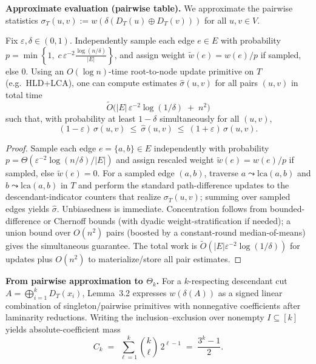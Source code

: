 \documentclass[11pt,letterpaper]{article}
\begin{document}
\medskip
\noindent\textbf{Approximate evaluation (pairwise table).}
We approximate the pairwise statistics $\sigma_T(u,v):=w(\delta(D_T(u)\oplus D_T(v)))$ for all $u,v\in V$.

\begin{lemma}\label{lem:approx-sigma}
Fix $\varepsilon,\delta\in(0,1)$. Independently sample each edge $e\in E$ with probability
$p=\min\!\left\{1,\;c\,\varepsilon^{-2}\frac{\log(n/\delta)}{|E|}\right\}$,
and assign weight $\tilde w(e)=w(e)/p$ if sampled, else $0$.
Using an $O(\log n)$-time root-to-node update primitive on $T$ (e.g.\ HLD+LCA),
one can compute estimates $\hat\sigma(u,v)$ for all pairs $(u,v)$ in total time
\[
\tilde O\!\Big(|E|\,\varepsilon^{-2}\log(1/\delta)\;+\;n^2\Big)
\]
such that, with probability at least $1-\delta$ simultaneously for all $(u,v)$,
\[
(1-\varepsilon)\,\sigma(u,v)\ \le\ \hat\sigma(u,v)\ \le\ (1+\varepsilon)\,\sigma(u,v).
\]
\end{lemma}

\begin{proof}
Sample each edge $e=\{a,b\}\in E$ independently with probability
$p=\Theta(\varepsilon^{-2}\log(n/\delta)/|E|)$ and assign rescaled weight
$\tilde w(e)=w(e)/p$ if sampled, else $\tilde w(e)=0$.
For a sampled edge $(a,b)$, traverse $a\leadsto \mathrm{lca}(a,b)$ and $b\leadsto \mathrm{lca}(a,b)$ in $T$ and perform the standard path-difference updates to the descendant-indicator counters that realize $\sigma_T(u,v)$; summing over sampled edges yields $\hat\sigma$.
Unbiasedness is immediate.
Concentration follows from bounded-difference or Chernoff bounds (with dyadic weight-stratification if needed); a union bound over $O(n^2)$ pairs (boosted by a constant-round median-of-means) gives the simultaneous guarantee.
The total work is $\tilde O(|E|\varepsilon^{-2}\log(1/\delta))$ for updates plus $O(n^2)$ to materialize/store all pair estimates.
\end{proof}

\medskip
\noindent\textbf{From pairwise approximation to $\Theta_k$.}
For a $k$-respecting descendant cut $A=\bigoplus_{i=1}^k D_T(x_i)$, Lemma~3.2 expresses $w(\delta(A))$ as a signed linear combination of singleton/pairwise primitives with nonnegative coefficients after laminarity reductions.
Writing the inclusion--exclusion over nonempty $I\subseteq[k]$ yields absolute-coefficient mass
\begin{equation}\label{eq:coef-mass}
C_k \;=\;\sum_{\ell=1}^{k} \binom{k}{\ell}\,2^{\ell-1}
\;=\;\frac{3^{k}-1}{2}.
\end{equation}
\end{document}
